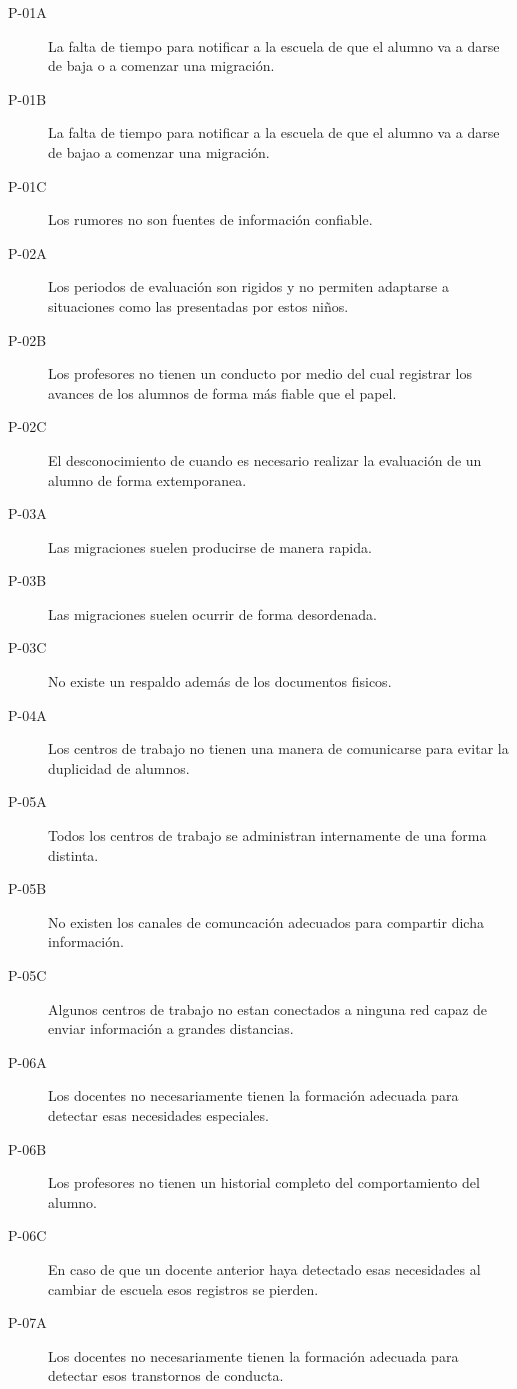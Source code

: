 \begin{description}
	\item[P-01A] La falta de tiempo para notificar a la escuela de que el alumno va a darse de baja o a comenzar una migración.
    \item[P-01B] La falta de tiempo para notificar a la escuela de que el alumno va a darse de bajao a comenzar una migración.
	\item[P-01C] Los rumores no son fuentes de información confiable.
 \item[P-02A] Los periodos de evaluación son rigidos y no permiten adaptarse a situaciones como las presentadas por estos niños.
    \item[P-02B] Los profesores no tienen un conducto por medio del cual registrar los avances de los alumnos de forma más fiable que el papel.
	\item[P-02C] El desconocimiento de cuando es necesario realizar la evaluación de un alumno de forma extemporanea.
 \item[P-03A]Las migraciones suelen producirse de manera rapida.
    \item[P-03B] Las migraciones suelen ocurrir de forma desordenada.
	\item[P-03C] No existe un respaldo además de los documentos fisicos.
 \item[P-04A] Los centros de trabajo no tienen una manera de comunicarse para evitar la duplicidad de alumnos.
    \item[P-05A]Todos los centros de trabajo se administran internamente de una forma distinta.
    \item[P-05B] No existen los canales de comuncación adecuados para compartir dicha información.
	\item[P-05C] Algunos centros de trabajo no estan conectados a ninguna red capaz de enviar información a grandes distancias.
 \item[P-06A] Los docentes no necesariamente tienen la formación adecuada para detectar esas necesidades especiales.
    \item[P-06B] Los profesores no tienen un historial completo del comportamiento del alumno.
	\item[P-06C] En caso de que un docente anterior haya detectado esas necesidades al cambiar de escuela esos registros se pierden.
 \item[P-07A] Los docentes no necesariamente tienen la formación adecuada para detectar esos transtornos de conducta.

\end{description}
